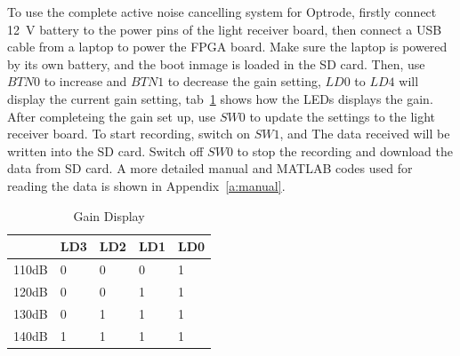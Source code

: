 To use the complete active noise cancelling system for Optrode, firstly connect \qty{12}{V} battery to the power pins of the light receiver board, then connect a USB cable from a laptop to power the FPGA board.  Make sure the laptop is powered by its own battery, and the boot inmage is loaded in the SD card.  Then, use $BTN0$ to increase and $BTN1$ to decrease the gain setting, $LD0$ to $LD4$ will display the current gain setting, tab~\ref{tab_GainDisplay} shows how the LEDs displays the gain.  After completeing the gain set up, use $SW0$ to update the settings to the light receiver board.  To start recording, switch on $SW1$, and The data received will be written into the SD card.  Switch off $SW0$ to stop the recording and download the data from SD card.  A more detailed manual and MATLAB codes used for reading the data is shown in Appendix~\ref{a:manual}.

\begin{table}[h]
\centering
\begin{tabular}{|l|l|l|l|l|}
\hline
\textbf{} & \multicolumn{1}{c|}{LD3} & \multicolumn{1}{c|}{LD2} & \multicolumn{1}{c|}{LD1} & \multicolumn{1}{c|}{LD0} \\ \hline
110dB & 0 & 0 & 0 & 1 \\ \hline
120dB & 0 & 0 & 1 & 1 \\ \hline
130dB & 0 & 1 & 1 & 1 \\ \hline
140dB & 1 & 1 & 1 & 1 \\ \hline
\end{tabular}
\caption{Gain Display}
\label{tab_GainDisplay}
\end{table}
